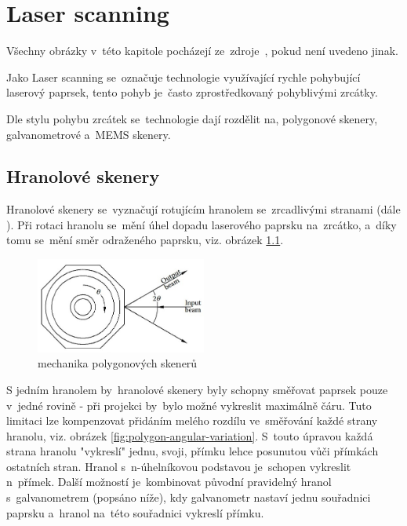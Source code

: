 \chapter{Laser scanning~\cite{scanning-handbook}}
Všechny obrázky v~této kapitole pocházejí ze~zdroje~\cite{scanning-handbook}, pokud není uvedeno jinak.

Jako Laser scanning se~označuje technologie využívající rychle pohybující laserový paprsek, tento pohyb je~často zprostředkovaný pohyblivými zrcátky.

Dle stylu pohybu zrcátek se~technologie dají rozdělit na, polygonové skenery, galvanometrové a~MEMS skenery.

\section{Hranolové skenery}
Hranolové skenery se~vyznačují rotujícím hranolem se~zrcadlivými stranami (dále ). Při rotaci hranolu se~mění úhel dopadu laserového paprsku na~zrcátko, a~díky tomu se~mění směr odraženého paprsku, viz. obrázek \ref{fig:polygon-scanner}. 

\begin{figure}[H]
  \centering
  \includegraphics[width=0.5\textwidth]{img/polygon-scanner.jpg}
  \caption{\label{fig:polygon-scanner} mechanika polygonových skenerů}
\end{figure}


%

S jedním hranolem by~hranolové skenery byly schopny směřovat paprsek pouze v~jedné rovině - při projekci by~bylo možné vykreslit maximálně čáru. Tuto limitaci lze kompenzovat přidáním melého rozdílu ve~směřování každé strany hranolu, viz. obrázek \ref{fig:polygon-angular-variation}. S~touto úpravou každá strana hranolu "vykreslí" jednu, svoji, přímku lehce posunutou vůči přímkách ostatních stran. Hranol s~n-úhelníkovou podstavou je~schopen vykreslit n~přímek.
Další možností je~kombinovat původní pravidelný hranol s~galvanometrem (popsáno níže), kdy galvanometr nastaví jednu souřadnici paprsku a~hranol na~této souřadnici vykreslí přímku.

